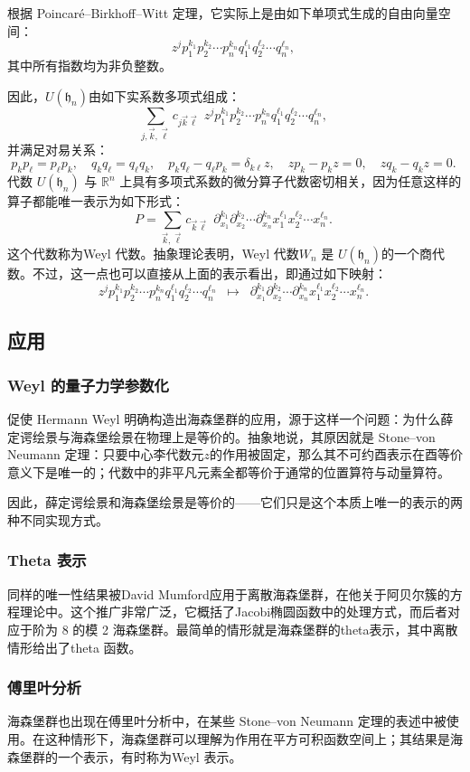 根据 Poincaré–Birkhoff–Witt 定理，它实际上是由如下单项式生成的自由向量空间：
$$
z^{j} p_{1}^{k_{1}} p_{2}^{k_{2}} \cdots p_{n}^{k_{n}} q_{1}^{\ell_{1}} q_{2}^{\ell_{2}} \cdots q_{n}^{\ell_{n}},~
$$
其中所有指数均为非负整数。

因此，$U(\mathfrak{h}_{n})$由如下实系数多项式组成：
$$
\sum_{j, \vec{k}, \vec{\ell}} c_{j \vec{k} \vec{\ell}} \,\, z^{j} p_{1}^{k_{1}} p_{2}^{k_{2}} \cdots p_{n}^{k_{n}} q_{1}^{\ell_{1}} q_{2}^{\ell_{2}} \cdots q_{n}^{\ell_{n}},~
$$
并满足对易关系：
$$
p_{k} p_{\ell} = p_{\ell} p_{k}, \quad 
q_{k} q_{\ell} = q_{\ell} q_{k}, \quad 
p_{k} q_{\ell} - q_{\ell} p_{k} = \delta_{k\ell} z, \quad 
zp_{k} - p_{k}z = 0, \quad 
zq_{k} - q_{k}z = 0.~
$$
代数 $U(\mathfrak{h}_{n})$ 与 $\mathbb{R}^{n}$ 上具有多项式系数的微分算子代数密切相关，因为任意这样的算子都能唯一表示为如下形式：
$$
P = \sum_{\vec{k}, \vec{\ell}} c_{\vec{k} \vec{\ell}} \,\, 
\partial_{x_{1}}^{k_{1}} \partial_{x_{2}}^{k_{2}} \cdots \partial_{x_{n}}^{k_{n}} 
x_{1}^{\ell_{1}} x_{2}^{\ell_{2}} \cdots x_{n}^{\ell_{n}}.~
$$
这个代数称为Weyl 代数。抽象理论表明，Weyl 代数$W_{n}$ 是 $U(\mathfrak{h}_{n})$的一个商代数。不过，这一点也可以直接从上面的表示看出，即通过如下映射：
$$
z^{j} p_{1}^{k_{1}} p_{2}^{k_{2}} \cdots p_{n}^{k_{n}} q_{1}^{\ell_{1}} q_{2}^{\ell_{2}} \cdots q_{n}^{\ell_{n}}
\;\;\mapsto\;\;
\partial_{x_{1}}^{k_{1}} \partial_{x_{2}}^{k_{2}} \cdots \partial_{x_{n}}^{k_{n}}
x_{1}^{\ell_{1}} x_{2}^{\ell_{2}} \cdots x_{n}^{\ell_{n}}.~
$$
\subsection{应用}
\subsubsection{Weyl 的量子力学参数化}
促使 Hermann Weyl 明确构造出海森堡群的应用，源于这样一个问题：为什么薛定谔绘景与海森堡绘景在物理上是等价的。抽象地说，其原因就是 Stone–von Neumann 定理：只要中心李代数元$z$的作用被固定，那么其不可约酉表示在酉等价意义下是唯一的；代数中的非平凡元素全都等价于通常的位置算符与动量算符。

因此，薛定谔绘景和海森堡绘景是等价的——它们只是这个本质上唯一的表示的两种不同实现方式。
\subsubsection{Theta 表示}
同样的唯一性结果被David Mumford应用于离散海森堡群，在他关于阿贝尔簇的方程理论中。这个推广非常广泛，它概括了Jacobi椭圆函数中的处理方式，而后者对应于阶为 8 的模 2 海森堡群。最简单的情形就是海森堡群的theta表示，其中离散情形给出了theta 函数。
\subsubsection{傅里叶分析}
海森堡群也出现在傅里叶分析中，在某些 Stone–von Neumann 定理的表述中被使用。在这种情形下，海森堡群可以理解为作用在平方可积函数空间上；其结果是海森堡群的一个表示，有时称为Weyl 表示。
